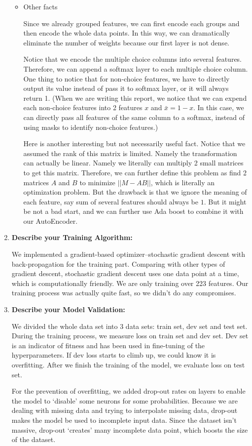 \documentclass[11pt, a4paper]{article}
\begin{document}
\begin{enumerate}
\begin{itemize}
		\item {Other facts}
		\par{Since we already grouped features, we can first encode each groups and then encode the whole data points. In this way, we can dramatically eliminate the number of weights because our first layer is not dense.}
		\par{Notice that we encode the multiple choice columns into several features. Therefore, we can append a softmax layer to each multiple choice column. One thing to notice that for non-choice features, we have to directly output its value instead of pass it to softmax layer, or it will always return 1. (When we are writing this report, we notice that we can expend each non-choice features into 2 features $x$ and $\bar x = 1-x$. In this case, we can directly pass all features of the same column to a softmax, instead of using masks to identify non-choice features.)}
		\par{Here is another interesting but not necessarily useful fact. Notice that we assumed the rank of this matrix is limited. Namely the transformation can actually be linear. Namely we literally can multiply 2 small matrices to get this matrix. Therefore, we can further define this problem as find 2 matrices $A$ and $B$ to minimize $||M - AB||$, which is literally an optimization problem. But the drawback is that we ignore the meaning of each feature, say sum of several features should always be $1$. But it might be not a bad start, and we can further use Ada boost to combine it with our AutoEncoder.}
	\end{itemize}
	
	\item {\textbf{Describe your Training Algorithm:}}
	\par{We implemented a gradient-based optimizer--stochastic gradient descent with back-propagation for the training part. Comparing with other types of gradient descent, stochastic gradient descent uses one data point at a time, which is computationally friendly. We are only training over 223 features. Our training process was actually quite fast, so we didn't do any compromises.}
	
	\item {\textbf{Describe your Model Validation:}}
	\par{We divided the whole data set into 3 data sets: train set, dev set and test set. During the training process, we measure loss on train set and dev set. Dev set is an indicator of fitness and has been used in fine-tuning of the hyperparameters. If dev loss starts to climb up, we could know it is overfitting. After we finish the training of the model, we evaluate loss on test set.}
	\par{For the prevention of overfitting, we added drop-out rates on layers to enable the model to `disable' some neurons for some probabilities. Because we are dealing with missing data and trying to interpolate missing data, drop-out makes the model be used to incomplete input data. Since the dataset isn't massive, drop-out `creates' many incomplete data point, which boosts the size of the dataset.}
	

\end{enumerate}
\end{document}
